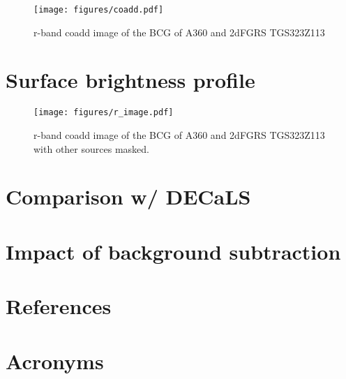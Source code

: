 \documentclass[SE,lsstdraft,authoryear,toc]{lsstdoc}
\begin{document}
\begin{figure}[htbp]
  \centering
  \texttt{[image: figures/coadd.pdf]}
  \caption{r-band coadd image of the BCG of A360 and 2dFGRS TGS323Z113 }
  \label{fig:r_image}
\end{figure}


\section{Surface brightness profile}



\begin{figure}[htbp]
  \centering
  \texttt{[image: figures/r\_image.pdf]}
  \caption{r-band coadd image of the BCG of A360 and 2dFGRS TGS323Z113 with other sources masked.}
  \label{fig:r_image}
\end{figure}

\section{Comparison w/ DECaLS}

\section{Impact of background subtraction}


\appendix
\section{References} \label{sec:bib}
\renewcommand{\refname}{} %


\section{Acronyms} \label{sec:acronyms}

\end{document}
